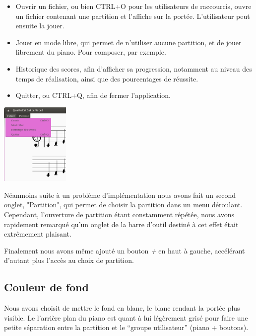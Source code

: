 \documentclass{article}
\begin{document}
\begin{itemize}
\item Ouvrir un fichier, ou bien CTRL+O pour les utilisateurs de raccourcis, ouvre un fichier contenant une partition et l'affiche sur la portée. L'utilisateur peut ensuite la jouer.
\item Jouer en mode libre, qui permet de n'utiliser aucune partition, et de jouer librement du piano. Pour composer, par exemple.
\item Historique des scores, afin d'afficher sa progression, notamment au niveau des temps de réalisation, ainsi que des pourcentages de réussite.
\item Quitter, ou CTRL+Q, afin de fermer l'application. 
\end{itemize}
\begin{center}
\includegraphics[width = 125px]{./images/toolBar.png}
\end{center}
Néanmoins suite à un problème d'implémentation nous avons fait un second onglet, "Partition", qui permet de choisir la partition dans un menu déroulant. Cependant, l'ouverture de partition étant constamment répétée, nous avons rapidement remarqué qu'un onglet de la barre d'outil destiné à cet effet était extrêmement plaisant. 

Finalement nous avons même ajouté un bouton \emph{+} en haut à gauche, accélérant d'autant plus l'accès au choix de partition. 

\subsection{Couleur de fond}
Nous avons choisit de mettre le fond en blanc, le blanc rendant la portée plus visible.
Le l'arrière plan du piano est quant à lui légèrement grisé pour faire une petite séparation entre la partition et le 
``groupe utilisateur'' (piano + boutons).
\end{document}
